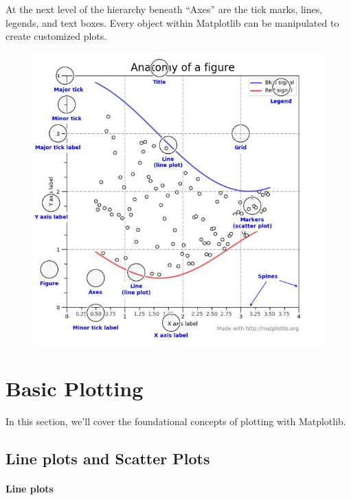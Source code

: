 \documentclass[11pt]{article}
\begin{document}
At the next level of the hierarchy beneath ``Axes'' are the tick marks,
lines, legends, and text boxes. Every object within Matplotlib can be
manipulated to create customized plots.

\begin{figure}
\centering
\includegraphics[scale=0.5]{fig_ana.jpg}
\end{figure}

\hypertarget{basic-plotting}{%
\section{Basic Plotting}\label{basic-plotting}}

In this section, we'll cover the foundational concepts of plotting with
Matplotlib.

\hypertarget{line-plots-and-scatter-plots}{%
\subsection{Line plots and Scatter
Plots}\label{line-plots-and-scatter-plots}}

\hypertarget{line-plots}{%
\paragraph{Line plots}\label{line-plots}}
\end{document}
